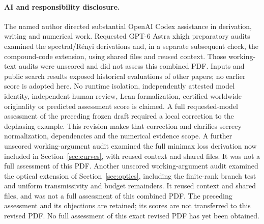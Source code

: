 \documentclass[11pt]{article}
\begin{document}
\paragraph{AI and responsibility disclosure.}
The named author directed substantial OpenAI Codex assistance in derivation,
writing and numerical work. Requested GPT-6 Astra xhigh preparatory audits
examined the spectral/R\'enyi derivations and, in a separate subsequent
check, the compound-code extension, using shared files and reused context.
Those working-text audits were unscored and did not assess this combined
PDF. Inputs and public search results exposed historical evaluations of
other papers; no earlier score is adopted here.
No runtime isolation, independently attested model identity, independent
human review, Lean formalization, certified worldwide originality or
predicted assessment score is claimed. A full requested-model assessment
of the preceding frozen draft required a local correction to the
dephasing example. This revision makes that correction and clarifies
secrecy normalization, dependencies and the numerical evidence scope.
A further unscored working-argument audit examined the full minimax
loss derivation now included in Section~\ref{sec:curves}, with reused
context and shared files. It was not a full assessment of this PDF.
Another unscored working-argument audit examined the optical extension
of Section~\ref{sec:optics}, including the finite-rank branch test and
uniform transmissivity and budget remainders. It reused context and
shared files, and was not a full assessment of this combined PDF.
The preceding assessment and its objections are retained; its scores
are not transferred to this revised PDF. No full assessment of this exact
revised PDF has yet been obtained.
\end{document}
